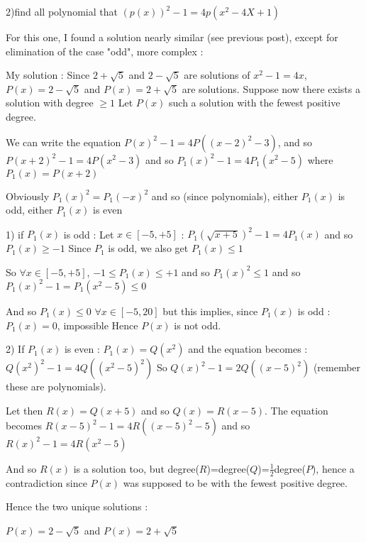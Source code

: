 \begin{solution}
	\begin{tcolorbox}2)find all polynomial that $ (p(x))^2 - 1 = 4p(x^2 - 4X + 1)$\end{tcolorbox}
For this one, I found a solution nearly similar (see previous post), except for elimination of the case "odd", more complex :

My solution :
Since $ 2+\sqrt 5$ and $ 2-\sqrt 5$ are solutions of $ x^2-1=4x$, $ P(x)=2-\sqrt 5$ and $ P(x)=2+\sqrt 5$ are solutions.
Suppose now there exists a solution with degree $ \ge 1$
Let $ P(x)$ such a solution with the fewest positive degree.

We can write the equation $ P(x)^2-1=4P((x-2)^2-3)$, and so $ P(x+2)^2-1=4P(x^2-3)$ and so $ P_1(x)^2-1=4P_1(x^2-5)$ where $ P_1(x)=P(x+2)$

Obviously $ P_1(x)^2=P_1(-x)^2$ and so (since polynomials), either $ P_1(x)$ is odd, either $ P_1(x)$ is even

1) if $ P_1(x)$ is odd :
Let $ x\in[-5,+5]$ : $ P_1(\sqrt{x+5})^2-1=4P_1(x)$ and so $ P_1(x)\ge -1$
Since $ P_1$ is odd, we also get $ P_1(x)\le 1$

So $ \forall x\in[-5,+5]$, $ -1\le P_1(x)\le +1$ and so $ P_1(x)^2\le 1$ and so $ P_1(x)^2-1=P_1(x^2-5)\le 0$

And so $ P_1(x)\le 0$ $ \forall x\in[-5,20]$ but this implies, since $ P_1(x)$ is odd : $ P_1(x)=0$, impossible
Hence $ P(x)$ is not odd.

2) If $ P_1(x)$ is even :
$ P_1(x)=Q(x^2)$ and the equation becomes : $ Q(x^2)^2-1=4Q((x^2-5)^2)$
So $ Q(x)^2-1=2Q((x-5)^2)$ (remember these are polynomials).

Let then $ R(x)=Q(x+5)$ and so $ Q(x)=R(x-5)$. The equation becomes $ R(x-5)^2-1=4R((x-5)^2-5)$ and so $ R(x)^2-1=4R(x^2-5)$

And so $ R(x)$ is a solution too, but degree($ R$)=degree($ Q$)=$ \frac 12$degree($ P$), hence a contradiction since $ P(x)$ was supposed to be with the fewest positive degree.

Hence the two unique solutions :

$ \boxed{P(x)=2-\sqrt 5}$ and $ \boxed{P(x)=2+\sqrt 5}$
\end{solution}



